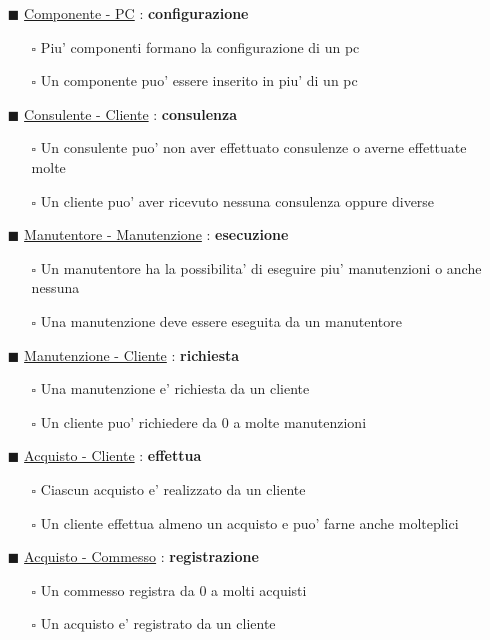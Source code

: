 \begin{itemize}
\item[$\blacksquare$]\underline{Componente - PC} : \textbf{configurazione}
\begin{itemize}
\item[$\square$]Piu' componenti formano la configurazione di un pc 
\item[$\square$]Un componente puo' essere inserito in piu' di un pc
\end{itemize}

\item[$\blacksquare$]\underline{Consulente - Cliente} : \textbf{consulenza}
\begin{itemize}
\item[$\square$]Un consulente puo' non aver effettuato consulenze o averne effettuate molte
\item[$\square$]Un cliente puo' aver ricevuto nessuna consulenza oppure diverse
\end{itemize}

\item[$\blacksquare$]\underline{Manutentore - Manutenzione} : \textbf{esecuzione}
\begin{itemize}
\item[$\square$]Un manutentore ha la possibilita' di eseguire piu' manutenzioni o anche nessuna
\item[$\square$]Una manutenzione deve essere eseguita da un manutentore
\end{itemize}

\item[$\blacksquare$]\underline{Manutenzione - Cliente} : \textbf{richiesta}
\begin{itemize}
\item[$\square$]Una manutenzione e' richiesta da un cliente
\item[$\square$]Un cliente puo' richiedere da 0 a molte manutenzioni
\end{itemize}

\item[$\blacksquare$]\underline{Acquisto - Cliente} : \textbf{effettua}
\begin{itemize}
\item[$\square$]Ciascun acquisto e' realizzato da un cliente
\item[$\square$]Un cliente effettua almeno un acquisto e puo' farne anche molteplici
\end{itemize}

\item[$\blacksquare$]\underline{Acquisto - Commesso} : \textbf{registrazione}
\begin{itemize}
\item[$\square$]Un commesso registra da 0 a molti acquisti
\item[$\square$]Un acquisto e' registrato da un cliente
\end{itemize}


\end{itemize}
